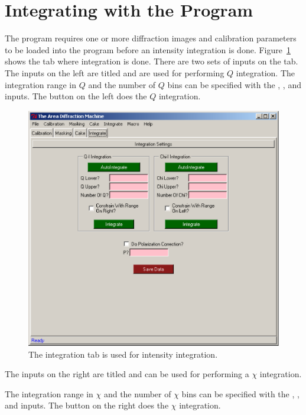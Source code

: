 \section{Integrating with the Program}

The program requires one or more diffraction images and
calibration parameters to be loaded into the program
before an intensity integration is done.
Figure~\ref{integration_tab} shows the
 tab where integration is done.
There are two sets of inputs on the tab. 
The inputs on the left are titled 
and are used for performing $Q$ integration.
The integration range in $Q$ and the number of $Q$ bins
can be specified with the , ,
and  inputs. The  button
on the left does the $Q$ integration.

\begin{figure}
    \centering
    \includegraphics[scale=.75]{figures/integration_tab.eps}
    \caption{The integration tab is used for intensity
    integration.}
    \label{integration_tab}
\end{figure}

The inputs on the right are titled 
and can be used for performing a $\chi$ integration.

The integration range in $\chi$ and the number of $\chi$ bins
can be specified with the , ,
and  inputs. 
The  button on the right does the $\chi$ integration.

